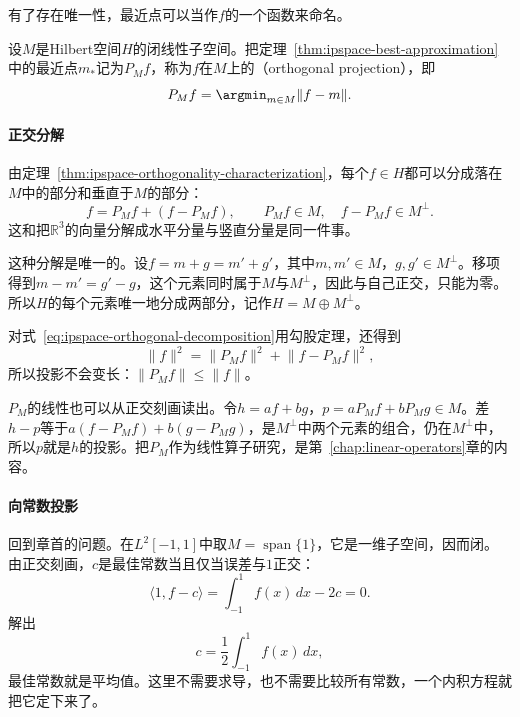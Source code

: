 有了存在唯一性，最近点可以当作$f$的一个函数来命名。

\begin{definition}[正交投影]
\label{def:ipspace-orthogonal-projection}
设$M$是Hilbert空间$H$的闭线性子空间。把定理~\ref{thm:ipspace-best-approximation}中的最近点$m_*$记为$P_Mf$，称为$f$在$M$上的（orthogonal projection），即
\begin{equation}
 P_Mf=\argmin_{m\in M}\lVert f-m\rVert .
 \label{eq:ipspace-projection}
\end{equation}
\end{definition}

\paragraph{正交分解}
由定理~\ref{thm:ipspace-orthogonality-characterization}，每个$f\in H$都可以分成落在$M$中的部分和垂直于$M$的部分：
\begin{equation}
 f=P_Mf+(f-P_Mf),\qquad P_Mf\in M,\quad f-P_Mf\in M^\perp .
 \label{eq:ipspace-orthogonal-decomposition}
\end{equation}
这和把$\mathbb R^3$的向量分解成水平分量与竖直分量是同一件事。

这种分解是唯一的。设$f=m+g=m'+g'$，其中$m,m'\in M$，$g,g'\in M^\perp$。移项得到$m-m'=g'-g$，这个元素同时属于$M$与$M^\perp$，因此与自己正交，只能为零。所以$H$的每个元素唯一地分成两部分，记作$H=M\oplus M^\perp$。

对式~\eqref{eq:ipspace-orthogonal-decomposition}用勾股定理，还得到
\[
 \lVert f\rVert^2=\lVert P_Mf\rVert^2+\lVert f-P_Mf\rVert^2 ,
\]
所以投影不会变长：$\lVert P_Mf\rVert\leq\lVert f\rVert$。

$P_M$的线性也可以从正交刻画读出。令$h=af+bg$，$p=aP_Mf+bP_Mg\in M$。差$h-p$等于$a(f-P_Mf)+b(g-P_Mg)$，是$M^\perp$中两个元素的组合，仍在$M^\perp$中，所以$p$就是$h$的投影。把$P_M$作为线性算子研究，是第~\ref{chap:linear-operators}章的内容。

\paragraph{向常数投影}
回到章首的问题。在$L^2[-1,1]$中取$M=\operatorname{span}\{1\}$，它是一维子空间，因而闭。由正交刻画，$c$是最佳常数当且仅当误差与$1$正交：
\[
 \langle1,f-c\rangle=\int_{-1}^1f(x)\,dx-2c=0 .
\]
解出
\begin{equation}
 c=\frac12\int_{-1}^1f(x)\,dx ,
 \label{eq:ipspace-constant-projection}
\end{equation}
最佳常数就是平均值。这里不需要求导，也不需要比较所有常数，一个内积方程就把它定下来了。

